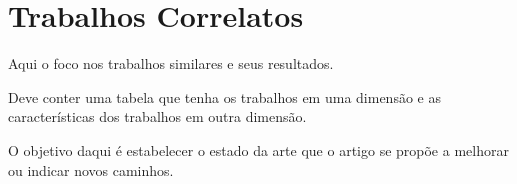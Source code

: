 \section{Trabalhos Correlatos}

Aqui o foco nos trabalhos similares e seus resultados.

Deve conter uma tabela que tenha os trabalhos em uma dimensão e as características dos trabalhos em outra dimensão.

O objetivo daqui é estabelecer o estado da arte que o artigo se propõe a melhorar ou indicar novos caminhos.


